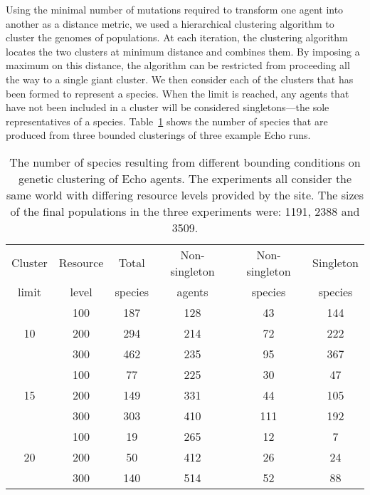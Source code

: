 Using the minimal number of mutations required to transform one agent
into another as a distance metric, we used a hierarchical clustering
algorithm to cluster the genomes of populations. At each iteration,
the clustering algorithm locates the two clusters at minimum distance
and combines them.  By imposing a maximum on this distance, the
algorithm can be restricted from proceeding all the way to a single
giant cluster. We then consider each of the clusters that has been
formed to represent a species.  When the limit is reached, any agents
that have not been included in a cluster will be considered
singletons---the sole representatives of a species.
Table~\ref{tab:cluster-params} shows the number of species that are
produced from three bounded clusterings of three example Echo runs.
\begin{table}
\begin{center}
\begin{tabular}{|c|c|c|c|c|c|} \hline
Cluster  & Resource & Total   & Non-singleton & Non-singleton & Singleton \\
limit    & level    & species & agents        & species       & species   \\
\hline
         & 100      &     187 &           128 &            43 &       144 \\
\cline{2-6}
10       & 200      &     294 &           214 &            72 &       222 \\
\cline{2-6}
         & 300      &     462 &           235 &            95 &       367 \\
\hline
         & 100      &      77 &           225 &            30 &        47 \\
\cline{2-6}
15       & 200      &     149 &           331 &            44 &       105 \\
\cline{2-6}
         & 300      &     303 &           410 &           111 &       192 \\
\hline
         & 100      &      19 &           265 &            12 &         7 \\
\cline{2-6}
20       & 200      &      50 &           412 &            26 &        24 \\
\cline{2-6}
         & 300      &     140 &           514 &            52 &        88 \\
\hline
\end{tabular}
\end{center}
\caption{The number of species resulting from different bounding
conditions on genetic clustering of Echo agents. The experiments all
consider the same world with differing resource levels provided by the
site. The sizes of the final populations in the three experiments
were: 1191, 2388 and 3509.
\label{tab:cluster-params}}
\end{table}



